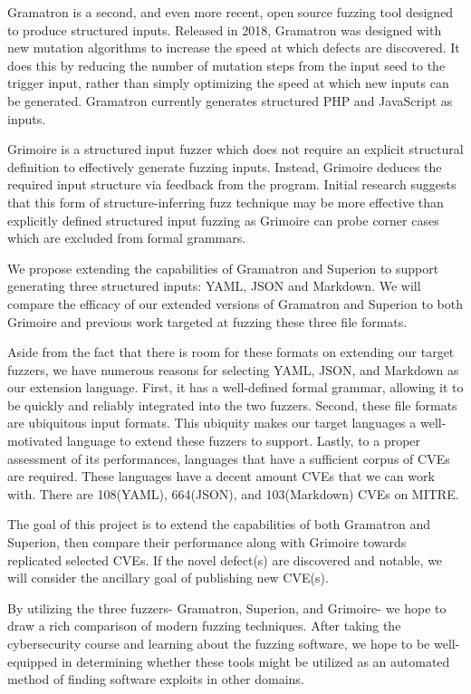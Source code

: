 \documentclass[12pt]{diazessay}
\begin{document}
Gramatron\cite{srivastava2021gramatron} is a second, and even more recent, open source fuzzing tool designed to produce structured inputs.
Released in 2018, Gramatron was designed with new mutation algorithms to increase the speed at which defects are discovered.
It does this by reducing the number of mutation steps from the input seed to the trigger input, rather than simply optimizing the speed at which new inputs can be generated.
Gramatron currently generates structured PHP and JavaScript as inputs.

Grimoire\cite{GRIMOIRE} is a structured input fuzzer which does not require an explicit structural definition to effectively generate fuzzing inputs.
Instead, Grimoire deduces the required input structure via feedback from the program.
Initial research suggests that this form of structure-inferring fuzz technique may be more effective than explicitly defined structured input fuzzing as Grimoire can probe corner cases which are excluded from formal grammars.

We propose extending the capabilities of Gramatron and Superion to support generating three structured inputs: YAML\cite{YAMLdraft}, JSON and Markdown.
We will compare the efficacy of our extended versions of Gramatron and Superion to both Grimoire and previous work targeted at fuzzing these three file formats.

Aside from the fact that there is room for these formats on extending our target fuzzers, we have numerous reasons for selecting YAML, JSON, and Markdown as our extension language.
First, it has a well-defined formal grammar, allowing it to be quickly and reliably integrated into the two fuzzers.
Second, these file formats are ubiquitous input formats.
This ubiquity makes our target languages a well-motivated language to extend these fuzzers to support.
Lastly, to a proper assessment of its performances, languages that have a sufficient corpus of CVEs are required. 
These languages have a decent amount CVEs that we can work with.
There are 108(YAML), 664(JSON), and 103(Markdown) CVEs on MITRE\cite{MITRE}.

The goal of this project is to extend the capabilities of both Gramatron and Superion, then compare their performance along with Grimoire towards replicated selected CVEs.
If the novel defect(s) are discovered and notable, we will consider the ancillary goal of publishing new CVE(s).

By utilizing the three fuzzers- Gramatron, Superion, and Grimoire- we hope to draw a rich comparison of modern fuzzing techniques.
After taking the cybersecurity course and learning about the fuzzing software, we hope to be well-equipped in determining whether these tools might be utilized as an automated method of finding software exploits in other domains.
\end{document}
